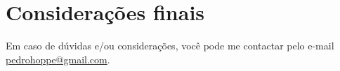 \documentclass[
article,			%
11pt,				%
oneside,			%
a4paper,			%
english,			%
brazil,				%
sumario=tradicional
]{abntex2}
\begin{document}








	\section{Considerações finais}
Em caso de dúvidas e/ou considerações, você pode me contactar pelo e-mail \url{pedrohoppe@gmail.com}.
	\postextual
	
	
	
	
\end{document}
